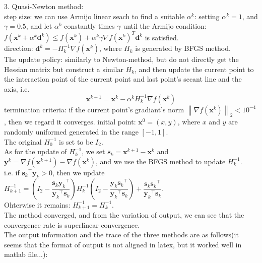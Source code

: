 \documentclass[10pt]{article}
\newcommand{\norm}[2]{\left\| #1 \right\|_{#2}}
\begin{document}
3. Quasi-Newton method:\\
step size: we can use Armijo linear seach to find a suitable $\alpha^k$: setting $\alpha^k=1$, and $\gamma=0.5$, and let $\alpha^k$ constantly times $\gamma$ until the Armijo condition: $f(\pmb x^k+\alpha^k\pmb d^k)\leq f(\pmb x^k)+\alpha^k\gamma\nabla f(\pmb x^k)^T\pmb d^k$ is satisfied.\\
direction: $\pmb d^k = -H_k^{-1}\nabla f(\pmb x^k)$, where $H_k$ is generated by BFGS method.\\
The update policy: similarly to Newton-method, but do not directly get the Hessian matrix but construct a similar $H_k$, and then update the current point to the interaction point of the current point and last point's secant line and the axis, i.e.
$$\pmb x^{k+1}=\pmb x^k-\alpha^kH_k^{-1}\nabla f(\pmb x^k)$$
termination criteria: if the current point's gradiant's norm $\norm{\nabla f(\pmb x^k)}{2}<10^{-4}$, then we regard it converges.
initial point: $\pmb x^0=(x,y)$, where $x$ and $y$ are randomly uniformed generated in the range $[-1,1]$.\\
The original $H_0^{-1}$ is set to be $I_2$.\\
As for the update of $H_k^{-1}$, we set $\pmb s_k=\pmb x^{k+1}-\pmb x^k$ and $\pmb y^k=\nabla f(\pmb x^{k+1})-\nabla f(\pmb x^k)$, and we use the BFGS method to update $H_k^{-1}$.\\
i.e. if ${\pmb s_k}^{\top}{\pmb y_k}>0$, then we update $H_{k+1}^{-1}=(I_2-\dfrac{{\pmb s_k}{\pmb y_k}^{\top}}{{\pmb y_k}^{\top}{\pmb s_k}})H_k^{-1}(I_2-\dfrac{{\pmb y_k}{\pmb s_k}^{\top}}{{\pmb y_k}^{\top}{\pmb s_k}})+\dfrac{{\pmb s_k}{\pmb s_k}^{\top}}{{\pmb y_k}^{\top}{\pmb s_k}}$.\\
Ohterwise it remains: $H_{k+1}^{-1}=H_k^{-1}$.\\
The method converged, and from the variation of output, we can see that the convergence rate is superlinear convergence.\\

The output information and the trace of the three methods are as follows(it seems that the format of output is not aligned in latex, but it worked well in matlab file...):
\end{document}
